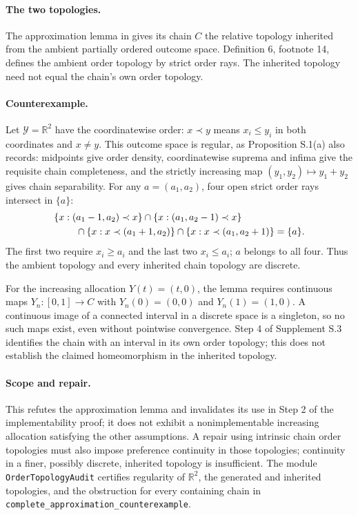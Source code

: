 \documentclass[11pt]{article}
\theoremstyle{remark}\newtheorem{remark}[theorem]{Remark}
\newcommand{\R}{\mathbb R}
\begin{document}
\paragraph{The two topologies.}
The approximation lemma in \citet[Appendix B.1.2]{Sinander2022} gives
its chain $C$ the relative topology inherited from the ambient partially
ordered outcome space.  Definition 6, footnote 14, defines the ambient
order topology by strict order rays.  The inherited topology need not
equal the chain's own order topology.

\paragraph{Counterexample.}
Let $\mathcal Y=\R^2$ have the coordinatewise order: $x\prec y$ means
$x_i\le y_i$ in both coordinates and $x\ne y$.
This outcome space is regular, as Proposition S.1(a) also records:
midpoints give order density, coordinatewise suprema and infima give
the requisite chain completeness, and the strictly increasing map
$(y_1,y_2)\mapsto y_1+y_2$ gives chain separability.
For any $a=(a_1,a_2)$, four open strict order rays intersect in $\{a\}$:
\[
\begin{split}
 &\{x:(a_1-1,a_2)\prec x\}
 \cap\{x:(a_1,a_2-1)\prec x\}\\
 &\hspace{8mm}\cap\{x:x\prec(a_1+1,a_2)\}
 \cap\{x:x\prec(a_1,a_2+1)\}=\{a\}.
\end{split}
\]
The first two require $x_i\ge a_i$ and the last two $x_i\le a_i$;
$a$ belongs to all four.  Thus the ambient topology and every inherited
chain topology are discrete.

For the increasing allocation $Y(t)=(t,0)$, the lemma requires
continuous maps $Y_n:[0,1]\to C$ with $Y_n(0)=(0,0)$ and
$Y_n(1)=(1,0)$.  A continuous image of a connected interval in a
discrete space is a singleton, so no such maps exist, even without
pointwise convergence.  Step 4 of Supplement S.3 identifies the chain
with an interval in its own order topology; this does not establish
the claimed homeomorphism in the inherited topology.

\paragraph{Scope and repair.}
This refutes the approximation lemma and invalidates its use in Step 2
of the implementability proof; it does not exhibit a nonimplementable
increasing allocation satisfying the other assumptions.
A repair using intrinsic chain order topologies must also impose
preference continuity in those topologies; continuity in a finer,
possibly discrete, inherited topology is insufficient.
The module \texttt{OrderTopologyAudit} certifies regularity of
$\mathbb R^2$, the generated and inherited topologies, and the obstruction
for every containing chain in
\texttt{complete\_\allowbreak approximation\_\allowbreak counterexample}.
\end{document}
